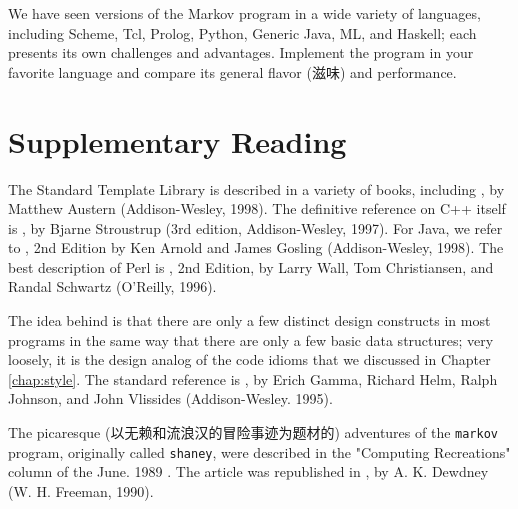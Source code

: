 \begin{exercise}
We have seen versions of the Markov program in a wide variety of languages,
including Scheme, Tcl, Prolog, Python, Generic Java, ML, and Haskell; each
presents its own challenges and advantages. Implement the program in your
favorite language and compare its general flavor (滋味) and performance.
\end{exercise}

\section*{Supplementary Reading}

The Standard Template Library is described in a variety of books, including
, by Matthew Austern
(Addison-Wesley, 1998).  The definitive reference on C++ itself is
, by Bjarne Stroustrup (3rd
edition, Addison-Wesley, 1997). For Java, we refer to , 2nd Edition by Ken Arnold and James Gosling
(Addison-Wesley, 1998). The best description of Perl is
, 2nd Edition, by Larry Wall, Tom Christiansen,
and Randal Schwartz (O'Reilly, 1996).

The idea behind  is that there are only a few
distinct design constructs in most programs in the same way that there are
only a few basic data structures; very loosely, it is the design analog of
the code idioms that we discussed in Chapter \ref{chap:style}. The standard
reference is , by Erich Gamma, Richard Helm, Ralph Johnson, and
John Vlissides (Addison-Wesley. 1995).

The picaresque (以无赖和流浪汉的冒险事迹为题材的) adventures of the
\verb'markov' program, originally called \verb'shaney', were described in
the "Computing Recreations" column of the June. 1989 . The article was republished in , by
A. K. Dewdney (W. H.  Freeman, 1990).
